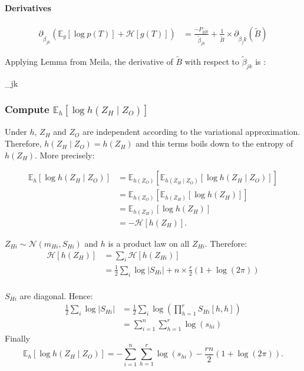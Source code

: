 \documentclass[11pt,a4paper]{article}
\newcommand*\lesswidefbox[1]{\fbox{\hspace{2em}#1\hspace{2em}}}
\newcommand{\Esp}{\mathds{E}}
\newcommand{\entr}{\mathcal{H}}
\begin{document}
\paragraph{Derivatives\\}
\begin{align*}
\partial_{\widetilde{\beta}_{jk}} \left(\Esp_g[\log p(T)] + \entr[g(T)]\right) &= \frac{-P_{gjk}}{\widetilde{\beta}_{jk}} + \frac{1}{\widetilde{B}} \times \partial_{\widetilde{\beta}_jk} (\widetilde{B})
\end{align*}

Applying Lemma from Meila, the derivative of $\widetilde{B}$ with respect to $\widetilde{\beta}_{jk}$ is :
\begin{empheq}[box=\lesswidefbox]{align*}\partial_{\widetilde{\beta}_{jk}} (\widetilde{B})& = [\bm{M}(\bm{W})]_{jk} \times {} 
\end{empheq}


\subsubsection{Compute $\Esp_h[\log h(Z_H\mid Z_O)]$}
Under $h$, $Z_H$ and $Z_O$ are independent according to the variational approximation. Therefore, $h(Z_H\mid Z_O) = h(Z_H)$ and this terms boils down to the entropy of $h(Z_H)$. More precisely:

\begin{align*}
\Esp_h[\log h(Z_H\mid Z_O)] &= \Esp_{h(Z_O)}\left[\Esp_{h(Z_H\mid Z_O)}[\log h(Z_H\mid Z_O)]\right]\\
&=\Esp_{h(Z_O)}\left[\Esp_{h(Z_H)}[\log h(Z_H)]\right]\\
&=\Esp_{h(Z_H)}[\log h(Z_H)] \\
&=-\entr[h(Z_H)].
\end{align*}


$Z_{Hi} \sim \mathcal{N}(m_{Hi},S_{Hi})$ and $h$ is a product law on all $Z_{Hi}$. Therefore: 
\begin{align*}
\entr[h(Z_H)] &= \sum_i \entr[h(Z_{Hi})] \\
&=\frac{1}{2} \sum_i\log |S_{Hi}| +n\times  \frac{r}{2}(1+\log(2\pi))\\
\end{align*}


$S_{Hi}$ are diagonal. Hence:
\begin{align*}
\frac{1}{2} \sum_i\log |S_{Hi}| &= \frac{1}{2} \sum_i \log \left(\prod_{h=1}^r S_{Hi}[h,h] \right)\\
&= \sum_{i=1}^n \sum_{h=1}^r \log(s_{hi})
\end{align*}
Finally $$ \Esp_h[\log h(Z_H\mid Z_O)] = -\sum_{i=1}^n \sum_{h=1}^r \log(s_{hi}) - \frac{rn}{2}(1+\log(2\pi)).$$
\end{document}
